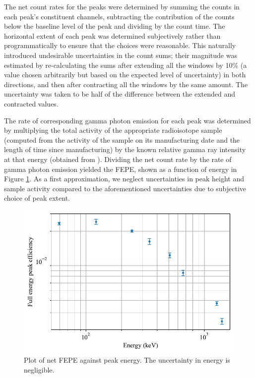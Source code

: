 \documentclass[twocol]{ametsocV6.1}
\begin{document}
The net count rates for the peaks were determined by summing the counts
in each peak's constituent channels, subtracting the contribution of the counts
below the baseline level of the peak and dividing by the count time.
The horizontal extent of each peak was determined subjectively rather than
programmatically to ensure that the choices were reasonable. This naturally
introduced undesirable uncertainties in the count sums; their magnitude
was estimated by re-calculating the sums after extending all the windows by
10\% (a value chosen arbitrarily but based on the expected level of
uncertainty) in both directions, and then after contracting all the windows by the
same amount. The uncertainty was taken to be half of the difference between
the extended and contracted values. 

The rate of corresponding gamma photon emission for each peak was determined
by multiplying the total activity of the appropriate radioisotope sample
(computed from the activity of the sample on its manufacturing date
and the length of time since manufacturing)
by the known relative gamma ray intensity at that energy (obtained from
\cite{notes}). Dividing the net count rate by the rate of gamma photon
emission yielded the FEPE, shown as a function
of energy in Figure \ref{fig:efficiency}.
As a first approximation, we neglect uncertainties in peak height
and sample activity compared to the aforementioned uncertainties
due to subjective choice of peak extent.

\begin{figure}[ht]
	\centering
	\includegraphics[width=\linewidth]{../figures/efficiency.pdf}
	\caption{
		Plot of net FEPE against
		peak energy. The uncertainty in energy is negligible.
	}
	\label{fig:efficiency}
\end{figure}
\end{document}
